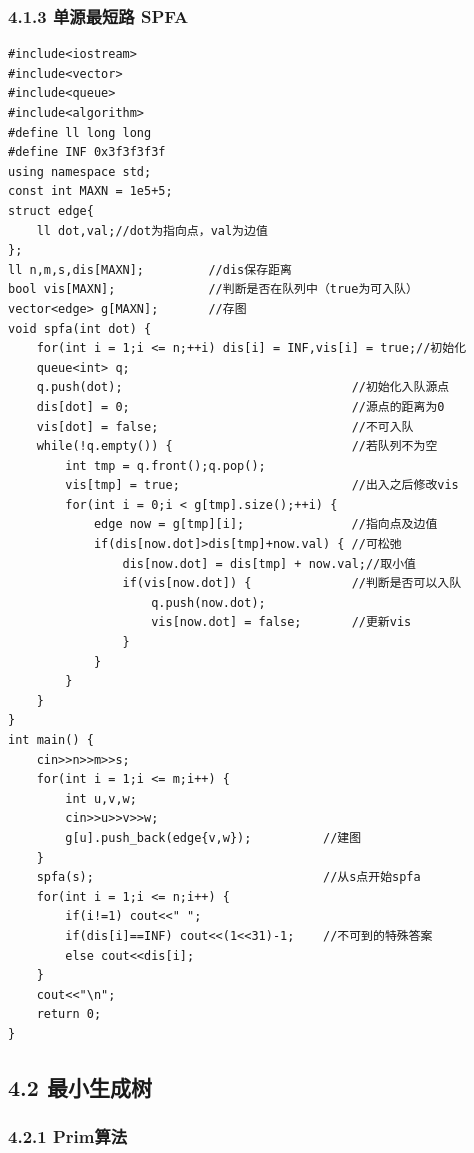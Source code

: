 \documentclass[11pt]{article}		%
\begin{document}
\subsubsection{4.1.3 单源最短路
SPFA}\label{ux5355ux6e90ux6700ux77edux8def-spfa}

\begin{verbatim}
#include<iostream>
#include<vector>
#include<queue>
#include<algorithm>
#define ll long long
#define INF 0x3f3f3f3f
using namespace std;
const int MAXN = 1e5+5;
struct edge{
    ll dot,val;//dot为指向点，val为边值
};
ll n,m,s,dis[MAXN];         //dis保存距离
bool vis[MAXN];             //判断是否在队列中（true为可入队）
vector<edge> g[MAXN];       //存图
void spfa(int dot) {
    for(int i = 1;i <= n;++i) dis[i] = INF,vis[i] = true;//初始化
    queue<int> q;
    q.push(dot);                                //初始化入队源点
    dis[dot] = 0;                               //源点的距离为0
    vis[dot] = false;                           //不可入队
    while(!q.empty()) {                         //若队列不为空
        int tmp = q.front();q.pop();
        vis[tmp] = true;                        //出入之后修改vis
        for(int i = 0;i < g[tmp].size();++i) {
            edge now = g[tmp][i];               //指向点及边值
            if(dis[now.dot]>dis[tmp]+now.val) { //可松弛
                dis[now.dot] = dis[tmp] + now.val;//取小值
                if(vis[now.dot]) {              //判断是否可以入队
                    q.push(now.dot);
                    vis[now.dot] = false;       //更新vis
                }
            }
        }
    }
}
int main() {
    cin>>n>>m>>s;
    for(int i = 1;i <= m;i++) {
        int u,v,w;
        cin>>u>>v>>w;
        g[u].push_back(edge{v,w});          //建图
    }
    spfa(s);                                //从s点开始spfa
    for(int i = 1;i <= n;i++) {
        if(i!=1) cout<<" ";
        if(dis[i]==INF) cout<<(1<<31)-1;    //不可到的特殊答案
        else cout<<dis[i];
    }
    cout<<"\n";
    return 0;
}

\end{verbatim}

\subsection{4.2 最小生成树}\label{ux6700ux5c0fux751fux6210ux6811}

\subsubsection{4.2.1 Prim算法}\label{primux7b97ux6cd5}
\end{document}
